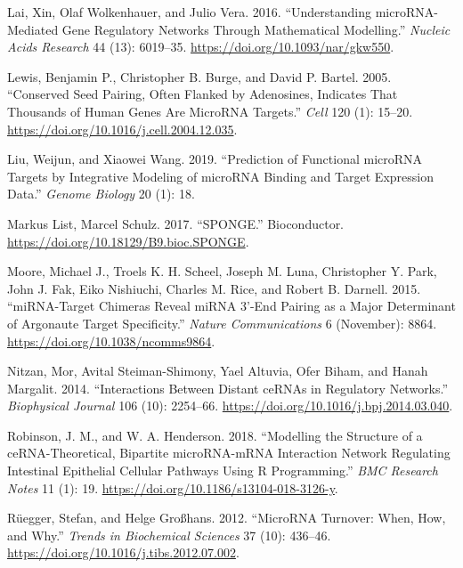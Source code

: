 \documentclass[]{article}
\begin{document}
\leavevmode\hypertarget{ref-lai_understanding_2016}{}%
Lai, Xin, Olaf Wolkenhauer, and Julio Vera. 2016. ``Understanding
microRNA-Mediated Gene Regulatory Networks Through Mathematical
Modelling.'' \emph{Nucleic Acids Research} 44 (13): 6019--35.
\url{https://doi.org/10.1093/nar/gkw550}.

\leavevmode\hypertarget{ref-lewis_conserved_2005}{}%
Lewis, Benjamin P., Christopher B. Burge, and David P. Bartel. 2005.
``Conserved Seed Pairing, Often Flanked by Adenosines, Indicates That
Thousands of Human Genes Are MicroRNA Targets.'' \emph{Cell} 120 (1):
15--20. \url{https://doi.org/10.1016/j.cell.2004.12.035}.

\leavevmode\hypertarget{ref-liu2019prediction}{}%
Liu, Weijun, and Xiaowei Wang. 2019. ``Prediction of Functional microRNA
Targets by Integrative Modeling of microRNA Binding and Target
Expression Data.'' \emph{Genome Biology} 20 (1): 18.

\leavevmode\hypertarget{ref-markus_list_sponge_2017}{}%
Markus List, Marcel Schulz. 2017. ``SPONGE.'' Bioconductor.
\url{https://doi.org/10.18129/B9.bioc.SPONGE}.

\leavevmode\hypertarget{ref-moore_mirnatarget_2015}{}%
Moore, Michael J., Troels K. H. Scheel, Joseph M. Luna, Christopher Y.
Park, John J. Fak, Eiko Nishiuchi, Charles M. Rice, and Robert B.
Darnell. 2015. ``miRNA-Target Chimeras Reveal miRNA 3'-End Pairing as a
Major Determinant of Argonaute Target Specificity.'' \emph{Nature
Communications} 6 (November): 8864.
\url{https://doi.org/10.1038/ncomms9864}.

\leavevmode\hypertarget{ref-nitzan_interactions_2014}{}%
Nitzan, Mor, Avital Steiman-Shimony, Yael Altuvia, Ofer Biham, and Hanah
Margalit. 2014. ``Interactions Between Distant ceRNAs in Regulatory
Networks.'' \emph{Biophysical Journal} 106 (10): 2254--66.
\url{https://doi.org/10.1016/j.bpj.2014.03.040}.

\leavevmode\hypertarget{ref-robinson_modelling_2018}{}%
Robinson, J. M., and W. A. Henderson. 2018. ``Modelling the Structure of
a ceRNA-Theoretical, Bipartite microRNA-mRNA Interaction Network
Regulating Intestinal Epithelial Cellular Pathways Using R
Programming.'' \emph{BMC Research Notes} 11 (1): 19.
\url{https://doi.org/10.1186/s13104-018-3126-y}.

\leavevmode\hypertarget{ref-ruegger_microrna_2012}{}%
Rüegger, Stefan, and Helge Großhans. 2012. ``MicroRNA Turnover: When,
How, and Why.'' \emph{Trends in Biochemical Sciences} 37 (10): 436--46.
\url{https://doi.org/10.1016/j.tibs.2012.07.002}.
\end{document}
